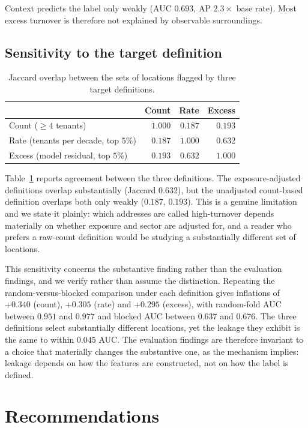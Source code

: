 \documentclass[11pt]{article}
\begin{document}
Context predicts the label only weakly (AUC $0.693$, AP $2.3\times$ base rate).
Most excess turnover is therefore not explained by observable surroundings.

\subsection{Sensitivity to the target definition}

\begin{table}[t]
\centering
\begin{tabular}{lrrr}
\toprule
 & Count & Rate & Excess \\
\midrule
Count ($\geq 4$ tenants)        & $1.000$ & $0.187$ & $0.193$ \\
Rate (tenants per decade, top $5\%$) & $0.187$ & $1.000$ & $0.632$ \\
Excess (model residual, top $5\%$)   & $0.193$ & $0.632$ & $1.000$ \\
\bottomrule
\end{tabular}
\caption{Jaccard overlap between the sets of locations flagged by three target
definitions.}
\label{tab:definitions}
\end{table}

Table~\ref{tab:definitions} reports agreement between the three definitions.
The exposure-adjusted definitions overlap substantially (Jaccard $0.632$), but
the unadjusted count-based definition overlaps both only weakly ($0.187$,
$0.193$). This is a genuine limitation and we state it plainly: which addresses
are called high-turnover depends materially on whether exposure and sector are
adjusted for, and a reader who prefers a raw-count definition would be studying
a substantially different set of locations.

This sensitivity concerns the substantive finding rather than the evaluation
findings, and we verify rather than assume the distinction. Repeating the
random-versus-blocked comparison under each definition gives inflations of
$+0.340$ (count), $+0.305$ (rate) and $+0.295$ (excess), with random-fold AUC
between $0.951$ and $0.977$ and blocked AUC between $0.637$ and $0.676$. The
three definitions select substantially different locations, yet the leakage they
exhibit is the same to within $0.045$ AUC. The evaluation findings are therefore
invariant to a choice that materially changes the substantive one, as the
mechanism implies: leakage depends on how the features are constructed, not on
how the label is defined.

\section{Recommendations}
\end{document}
